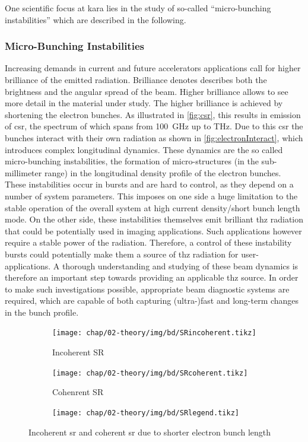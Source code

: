 One scientific focus at \gls{kara} lies in the study of so-called ``micro-bunching instabilities'' which are described in the following.

\subsubsection*{Micro-Bunching Instabilities}
Increasing demands in current and future accelerators applications call for higher brilliance of the emitted radiation. 
Brilliance denotes describes both the brightness and the angular spread of the beam. 
Higher brilliance allows to see more detail in the material under study.
The higher brilliance is achieved by shortening the electron bunches. 
As illustrated in \autoref{fig:csr}, this results in emission of \gls{csr}, the spectrum of which spans from \SI{100}{\GHz} up to THz.
Due to this \gls{csr} the bunches interact with their own radiation as shown in \autoref{fig:electronInteract}, which introduces complex longitudinal dynamics.
These dynamics are the so called micro-bunching instabilities, the formation of micro-structures (in the sub-millimeter range) in the longitudinal density profile of the electron bunches.
These instabilities occur in bursts and are hard to control, as they depend on a number of system parameters.
This imposes on one side a huge limitation to the stable operation of the overall system at high current density/short bunch length mode.
On the other side, these instabilities themselves emit brilliant \gls{thz} radiation that could be potentially used in imaging applications.
Such applications however require a stable power of the radiation. 
Therefore, a control of these instability bursts could potentially make them a source of \gls{thz} radiation for user-applications. 
A thorough understanding and studying of these beam dynamics is therefore an important step towards providing an applicable \gls{thz} source. \cite{rota2018,brosi}
In order to make such investigations possible, appropriate beam diagnostic systems are required, which are capable of both capturing (ultra-)fast and long-term changes in the bunch profile.  
\begin{figure}[tb]
	\centering
	\begin{subfigure}{0.4\textwidth}
		\centering
		\texttt{[image: chap/02-theory/img/bd/SRincoherent.tikz]}  
		\caption{Incoherent SR}
		\label{fig:srincoherent}
	\end{subfigure}
	\hfill
	\begin{subfigure}{0.4\textwidth}
		\centering
		\texttt{[image: chap/02-theory/img/bd/SRcoherent.tikz]}  
		\caption{Cohenrent SR}
		\label{fig:srcoherent}
	\end{subfigure}
	\begin{center}
		\begin{subfigure}{0.4\textwidth}
			\centering
			\texttt{[image: chap/02-theory/img/bd/SRlegend.tikz]}  
			\label{fig:srlegend}
		\end{subfigure}
	\end{center}
	\caption[Incoherent and coherent SR]{Incoherent \gls{sr} and coherent \gls{sr} due to shorter electron bunch length \cite{rota2018}}
	\label{fig:csr}
\end{figure}
